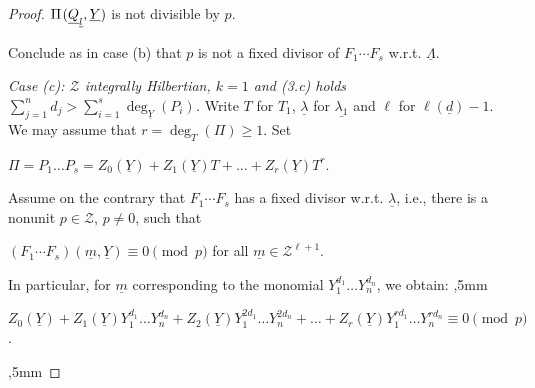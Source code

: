 \documentclass[10pt,a4paper]{amsart}
\begin{document}
\begin{proof}
\centerline{$\Pi\hskip 1pt (\underline Q_{\underline l},\underline Y)$ is not divisible by $p$.}
\vskip 1mm

\noindent
Conclude as in case (b) that $p$ is not a fixed divisor of $F_1\cdots F_s$ \hbox{w.r.t.} $\underline{\Lambda}$.
\vskip 2mm

\noindent
\emph{Case {\rm (c)}: ${\mathcal Z}$ integrally Hilbertian, $k=1$ and \hbox{\rm (3.c)} holds
$\sum_{j=1}^n d_j > \sum_{i=1}^s \deg_{\underline Y}(P_i)$.}
Write $T$ for $T_1$, $\underline \lambda$ for $\underline{\lambda_1}$ and $\ell$ for $\ell(\underline d)-1$. We may assume that $r=\deg_T(\Pi) \geq 1$. Set
\vskip 1mm

\centerline{$\Pi= P_1 \dots P_s=Z_0(\underline{Y})+Z_1(\underline{Y})T+\dots+Z_r(\underline{Y})T^r$.}
\vskip 1mm

\noindent
Assume on the contrary that $F_1\cdots F_s$ has a fixed divisor \hbox{w.r.t.} $\underline{\lambda}$, \hbox{i.e.}, there is a nonunit $p\in \mathcal{Z}$, $p\not=0$, such that 
\vskip 1mm

\centerline{$(F_1\cdots F_s)(\underline{m},\underline{Y})\equiv 0 \pmod{p}$\hskip 2mm for all $\underline{m} \in \mathcal{Z}^{\ell+1}$.}
\vskip 1mm


\noindent
In particular, for $\underline m$ corresponding to the monomial $Y_1^{d_1}\dots Y_n^{d_n}$, we obtain:
,5mm

\centerline{$Z_0(\underline{Y})+Z_1(\underline{Y})Y_1^{d_1}\dots Y_n^{d_n}+Z_2(\underline{Y})Y_1^{2d_1}\dots Y_n^{2d_n}+\dots+Z_r(\underline{Y})Y_1^{r d_1}\dots Y_n^{r d_n}\equiv 0 \pmod{p}$.}
,5mm






\end{proof}
\end{document}
